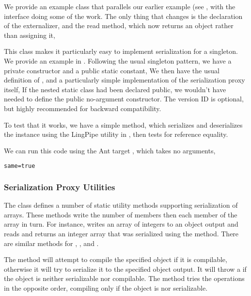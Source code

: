 We provide an example class  that parallels
our earlier example  (see
, with the
 interface doing some of the work.  The
only thing that changes is the declaration of the externalizer,
%
%
and the read method, which now returns an object rather than
assigning it,
%

This class makes it particularly easy to implement serialization for a
singleton.  We provide an example in .  Following
the usual singleton pattern, we have a private constructor and a public
static constant,
%
%
We then have the usual definition of , and a
particularly simple implementation of the serialization proxy itself,
%
%
If the nested static class had been declared public, we wouldn't have
needed to define the public no-argument constructor.  The version ID
is optional, but highly recommended for backward compatibility.

To test that it works, we have a simple  method,
%
%
which serializes and deserializes the instance using the 
LingPipe utility in , then tests
for reference equality.

We can run this code using the Ant target ,
which takes no arguments,
%
\begin{verbatim}
same=true
\end{verbatim}

\subsubsection{Serialization Proxy Utilities}

The  class defines a number of static
utility methods supporting serialization of arrays.  These methods
write the number of members then each member of the array in turn.
For instance,  writes an array of
integers to an object output and  reads
and returns an integer array that was serialized using the
 method.  There are similar methods for ,
, and .

The method  will attempt
to compile the specified object if it is compilable, otherwise it
will try to serialize it to the specified object output.  It will throw
a  if the object is neither serializable
nor compilable.  The method 
tries the operations in the opposite order, compiling only if the
object is nor serializable.

